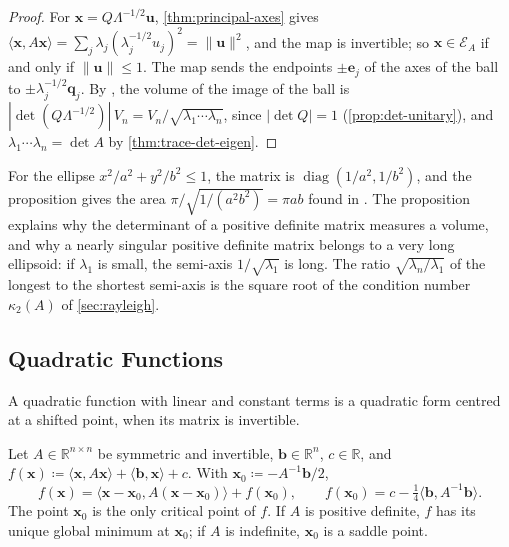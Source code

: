 \begin{proof}
For $\mathbf x=Q\Lambda^{-1/2}\mathbf u$, \cref{thm:principal-axes} gives $\langle\mathbf x,A\mathbf x\rangle=\sum_j\lambda_j(\lambda_j^{-1/2}u_j)^2=\|\mathbf u\|^2$, and the map is invertible; so $\mathbf x\in\mathcal E_A$ if and only if $\|\mathbf u\|\le1$. The map sends the endpoints $\pm\mathbf e_j$ of the axes of the ball to $\pm\lambda_j^{-1/2}\mathbf q_j$. By , the volume of the image of the ball is $|\det(Q\Lambda^{-1/2})|\,V_n=V_n/\sqrt{\lambda_1\cdots\lambda_n}$, since $|\det Q|=1$ (\cref{prop:det-unitary}), and $\lambda_1\cdots\lambda_n=\det A$ by \cref{thm:trace-det-eigen}.
\end{proof}

For the ellipse $x^2/a^2+y^2/b^2\le1$, the matrix is $\operatorname{diag}(1/a^2,1/b^2)$, and the proposition gives the area $\pi/\sqrt{1/(a^2b^2)}=\pi ab$ found in . The proposition explains why the determinant of a positive definite matrix measures a volume, and why a nearly singular positive definite matrix belongs to a very long ellipsoid: if $\lambda_1$ is small, the semi-axis $1/\sqrt{\lambda_1}$ is long. The ratio $\sqrt{\lambda_n/\lambda_1}$ of the longest to the shortest semi-axis is the square root of the condition number $\kappa_2(A)$ of \cref{sec:rayleigh}.

\subsection{Quadratic Functions}

A quadratic function with linear and constant terms is a quadratic form centred at a shifted point, when its matrix is invertible.

\begin{proposition}
\label{prop:quadratic-centre}
Let $A\in\mathbb R^{n\times n}$ be symmetric and invertible, $\mathbf b\in\mathbb R^n$, $c\in\mathbb R$, and $f(\mathbf x)\coloneqq\langle\mathbf x,A\mathbf x\rangle+\langle\mathbf b,\mathbf x\rangle+c$. With $\mathbf x_0\coloneqq-A^{-1}\mathbf b/2$,
\[
f(\mathbf x)=\langle\mathbf x-\mathbf x_0,A(\mathbf x-\mathbf x_0)\rangle+f(\mathbf x_0),\qquad f(\mathbf x_0)=c-\tfrac14\langle\mathbf b,A^{-1}\mathbf b\rangle .
\]
The point $\mathbf x_0$ is the only critical point of $f$. If $A$ is positive definite, $f$ has its unique global minimum at $\mathbf x_0$; if $A$ is indefinite, $\mathbf x_0$ is a saddle point.
\end{proposition}

